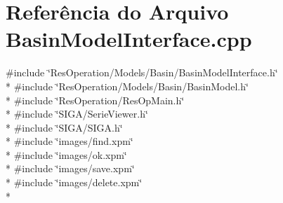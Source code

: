 \section{Referência do Arquivo Basin\+Model\+Interface.\+cpp}
\label{_basin_model_interface_8cpp}
{\ttfamily \#include \char`\"{}Res\+Operation/\+Models/\+Basin/\+Basin\+Model\+Interface.\+h\char`\"{}}\\*
{\ttfamily \#include \char`\"{}Res\+Operation/\+Models/\+Basin/\+Basin\+Model.\+h\char`\"{}}\\*
{\ttfamily \#include \char`\"{}Res\+Operation/\+Res\+Op\+Main.\+h\char`\"{}}\\*
{\ttfamily \#include \char`\"{}S\+I\+G\+A/\+Serie\+Viewer.\+h\char`\"{}}\\*
{\ttfamily \#include \char`\"{}S\+I\+G\+A/\+S\+I\+G\+A.\+h\char`\"{}}\\*
{\ttfamily \#include \char`\"{}images/find.\+xpm\char`\"{}}\\*
{\ttfamily \#include \char`\"{}images/ok.\+xpm\char`\"{}}\\*
{\ttfamily \#include \char`\"{}images/save.\+xpm\char`\"{}}\\*
{\ttfamily \#include \char`\"{}images/delete.\+xpm\char`\"{}}\\*
